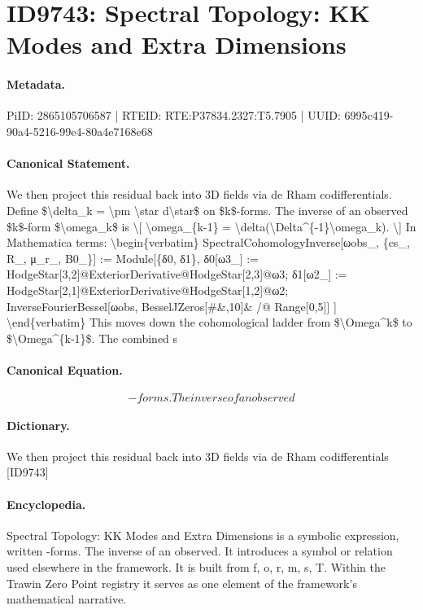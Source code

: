 \section*{ID9743: Spectral Topology: KK Modes and Extra Dimensions}
\paragraph{Metadata.}
PiID: 2865105706587 | RTEID: RTE:P37834.2327:T5.7905 | UUID: 6995c419-90a4-5216-99e4-80a4e7168e68

\paragraph{Canonical Statement.}
We then project this residual back into 3D fields via de Rham codifferentials. Define \$\textbackslash{}delta\_k = \textbackslash{}pm \textbackslash{}star d\textbackslash{}star\$ on \$k\$-forms. The inverse of an observed \$k\$-form \$\textbackslash{}omega\_k\$ is \textbackslash{}[ \textbackslash{}omega\_\{k-1\} = \textbackslash{}delta(\textbackslash{}Delta\textasciicircum{}\{-1\}\textbackslash{}omega\_k). \textbackslash{}] In Mathematica terms: \textbackslash{}begin\{verbatim\} SpectralCohomologyInverse[ωobs\_, \{cs\_, R\_, μ\_r\_, B0\_\}] := Module[\{δ0, δ1\}, δ0[ω3\_] := HodgeStar[3,2]@ExteriorDerivative@HodgeStar[2,3]@ω3; δ1[ω2\_] := HodgeStar[2,1]@ExteriorDerivative@HodgeStar[1,2]@ω2; InverseFourierBessel[ωobs, BesselJZeros[\#\&,10]\& /@ Range[0,5]] ] \textbackslash{}end\{verbatim\} This moves down the cohomological ladder from \$\textbackslash{}Omega\textasciicircum{}k\$ to \$\textbackslash{}Omega\textasciicircum{}\{k-1\}\$. The combined s

\paragraph{Canonical Equation.}
\[
-forms. The inverse of an observed
\]

\paragraph{Dictionary.}
We then project this residual back into 3D fields via de Rham codifferentials [ID9743]

\paragraph{Encyclopedia.}
Spectral Topology: KK Modes and Extra Dimensions is a symbolic expression, written -forms. The inverse of an observed. It introduces a symbol or relation used elsewhere in the framework. It is built from f, o, r, m, s, T. Within the Trawin Zero Point registry it serves as one element of the framework's mathematical narrative.
